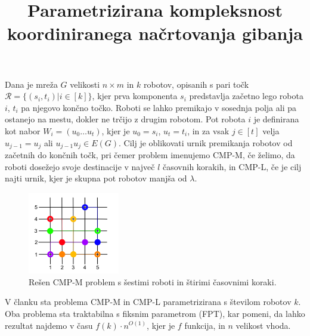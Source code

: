 \documentclass{article}
\title{Parametrizirana kompleksnost koordiniranega načrtovanja gibanja}
\begin{document}
Dana je mreža $G$ velikosti $n \times m$ in $k$ robotov, opisanih s pari točk $\mathcal{R} = \{ (s_i, t_i) | i \in [ k ] \} $, kjer prva komponenta $s_i$ predstavlja začetno lego robota $i$, $t_i$ pa njegovo končno točko. Roboti se lahko premikajo v sosednja polja ali pa ostanejo na mestu, dokler ne trčijo z drugim robotom. Pot robota $i$ je definirana kot nabor $W_i = (u_0 \dots u_t)$, kjer je $u_0 = s_i$, $u_t = t_i$, in za vsak $j \in [t]$ velja $u_{j-1} = u_j$ ali $u_{j-1} u_j \in E(G)$. Cilj je oblikovati urnik premikanja robotov od začetnih do končnih točk, pri čemer problem imenujemo CMP-M, če želimo, da roboti dosežejo svoje destinacije v največ $l$ časovnih korakih, in CMP-L, če je cilj najti urnik, kjer je skupna pot robotov manjša od $\lambda$.

\begin{figure}[h]
    \centering
    \includegraphics[width=4cm]{cmp-m.png}
    \caption{Rešen CMP-M problem s šestimi roboti in štirimi časovnimi koraki.}
\end{figure}

V članku sta problema CMP-M in CMP-L parametrizirana s številom robotov $k$. Oba problema sta traktabilna s fiksnim parametrom (FPT), kar pomeni, da lahko rezultat najdemo v času $f(k) \cdot n^{O(1)}$, kjer je $f$ funkcija, in $n$ velikost vhoda.
\end{document}
